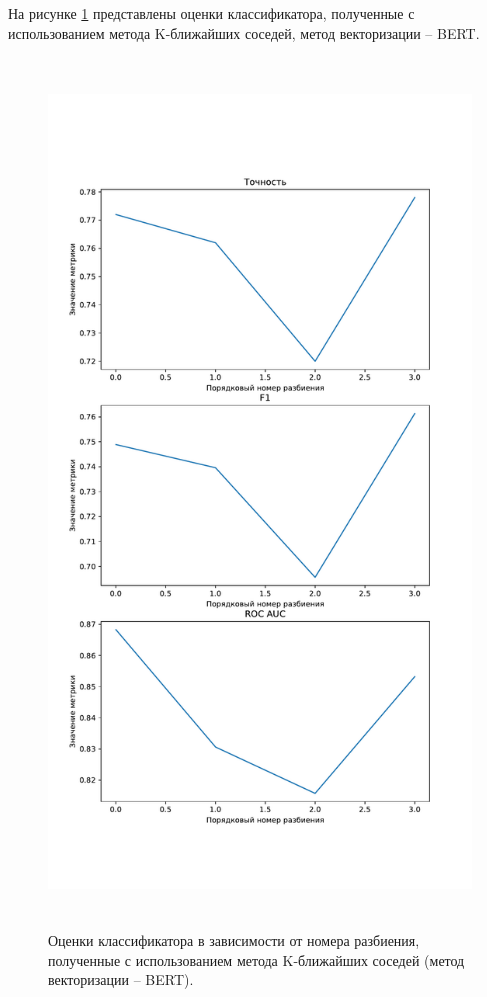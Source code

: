 На рисунке \ref{img:knnMetricsBert} представлены оценки классификатора, полученные с использованием метода K-ближайших соседей, метод векторизации -- BERT.
\begin{figure}[H]
	\centering
	\includegraphics[height=23cm]{inc/plots/knnMetricsBert.pdf}
	\caption{ Оценки классификатора в зависимости от номера разбиения, полученные с использованием метода K-ближайших соседей (метод векторизации -- BERT). }
	\label{img:knnMetricsBert}
\end{figure}



